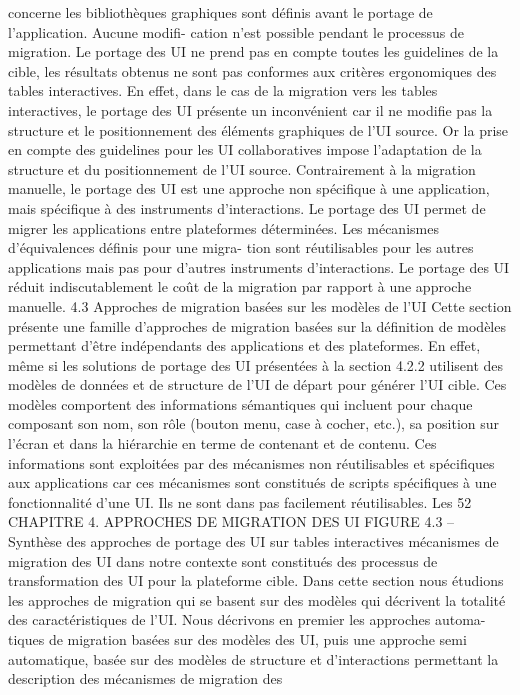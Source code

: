 \documentclass{article}
\begin{document}
concerne les bibliothèques graphiques sont déﬁnis avant le portage de l’application. Aucune modiﬁ-
cation n’est possible pendant le processus de migration.
Le portage des UI ne prend pas en compte toutes les guidelines de la cible, les résultats obtenus
ne sont pas conformes aux critères ergonomiques des tables interactives. En effet, dans le cas de la
migration vers les tables interactives, le portage des UI présente un inconvénient car il ne modiﬁe pas
la structure et le positionnement des éléments graphiques de l’UI source. Or la prise en compte des
guidelines pour les UI collaboratives impose l’adaptation de la structure et du positionnement de l’UI
source.
Contrairement à la migration manuelle, le portage des UI est une approche non spéciﬁque à une
application, mais spéciﬁque à des instruments d’interactions. Le portage des UI permet de migrer les
applications entre plateformes déterminées. Les mécanismes d’équivalences déﬁnis pour une migra-
tion sont réutilisables pour les autres applications mais pas pour d’autres instruments d’interactions.
Le portage des UI réduit indiscutablement le coût de la migration par rapport à une approche manuelle.
4.3
Approches de migration basées sur les modèles de l’UI
Cette section présente une famille d’approches de migration basées sur la déﬁnition de modèles
permettant d’être indépendants des applications et des plateformes. En effet, même si les solutions de
portage des UI présentées à la section 4.2.2 utilisent des modèles de données et de structure de l’UI
de départ pour générer l’UI cible. Ces modèles comportent des informations sémantiques qui incluent
pour chaque composant son nom, son rôle (bouton menu, case à cocher, etc.), sa position sur l’écran
et dans la hiérarchie en terme de contenant et de contenu. Ces informations sont exploitées par des
mécanismes non réutilisables et spéciﬁques aux applications car ces mécanismes sont constitués de
scripts spéciﬁques à une fonctionnalité d’une UI. Ils ne sont dans pas facilement réutilisables. Les
52
CHAPITRE 4. APPROCHES DE MIGRATION DES UI
FIGURE 4.3 – Synthèse des approches de portage des UI sur tables interactives
mécanismes de migration des UI dans notre contexte sont constitués des processus de transformation
des UI pour la plateforme cible.
Dans cette section nous étudions les approches de migration qui se basent sur des modèles qui
décrivent la totalité des caractéristiques de l’UI. Nous décrivons en premier les approches automa-
tiques de migration basées sur des modèles des UI, puis une approche semi automatique, basée sur
des modèles de structure et d’interactions permettant la description des mécanismes de migration des
\end{document}
